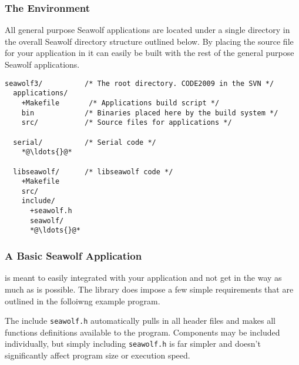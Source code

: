 \subsubsection{The Environment} \label{environment}
All general purpose Seawolf applications are located under a single directory in
the overall Seawolf directory structure outlined below. By placing the source
file for your application in  it can easily be
built with the rest of the general purpose Seawolf applications.

\begin{lstlisting}[language=FileList, caption=Directory structure, escapeinside={{*@}{@*}}]
seawolf3/          /* The root directory. CODE2009 in the SVN */
  applications/
    +Makefile       /* Applications build script */
    bin            /* Binaries placed here by the build system */
    src/           /* Source files for applications */
  
  serial/          /* Serial code */
    *@\ldots{}@*
 
  libseawolf/      /* libseawolf code */
    +Makefile
    src/
    include/
      +seawolf.h
      seawolf/
      *@\ldots{}@*
\end{lstlisting}

\subsubsection{A Basic Seawolf Application} \label{environmentbasicapp}
\libseawolf{} is meant to easily integrated with your application and not get in
the way as much as is possible. The library does impose a few simple
requirements that are outlined in the folloiwng example program.



\par The include \texttt{seawolf.h} automatically pulls in all \libseawolf{}
header files and makes all functions definitions available to the
program. Components may be included individually, but simply including
\texttt{seawolf.h} is far simpler and doesn't significantly affect program size
or execution speed.

